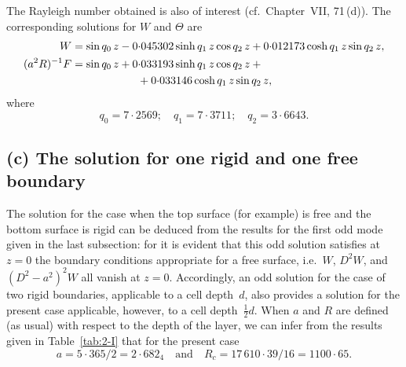 


The Rayleigh number obtained is also of interest (cf.\ Chapter~VII, 71\,(d)).
The corresponding solutions for $W$ and $\Theta$ are
\begin{align}
\label{eq:2-225}
W &= \sin q_0\,z - 0{\cdot}045302\sinh q_1\,z\cos q_2\,z + 0{\cdot}012173\cosh q_1\,z\sin q_2\,z, \notag\\
(a^2 R)^{-1}F &= \sin q_0\,z + 0{\cdot}033193\sinh q_1\,z\cos q_2\,z + {} \notag\\
&\qquad\qquad\qquad{} + 0{\cdot}033146\cosh q_1\,z\sin q_2\,z,
\end{align}
where
\begin{equation}
\label{eq:2-225p}
q_0 = 7{\cdot}2569;\quad q_1 = 7{\cdot}3711;\quad q_2 = 3{\cdot}6643.
\end{equation}


\subsection*{(c) The solution for one rigid and one free boundary}

The solution for the case when the top surface (for example) is free
and the bottom surface is rigid can be deduced from the results for the
first odd mode given in the last subsection: for it is evident that this odd
solution satisfies at $z = 0$ the boundary conditions appropriate for a
free surface, i.e.\ $W$, $D^2W$, and $(D^2 - a^2)^2W$ all vanish at $z = 0$.
Accordingly, an odd solution for the case of two rigid boundaries, applicable
to a cell depth~$d$, also provides a solution for the present case applicable,
however, to a cell depth~$\tfrac{1}{2}d$. When $a$ and $R$ are defined (as usual) with
respect to the depth of the layer, we can infer from the results given in
Table~\ref{tab:2-I} that for the present case
\begin{equation}
\label{eq:2-226b}
a = 5{\cdot}365/2 = 2{\cdot}682_4 \quad\text{and}\quad R_c = 17\,610{\cdot}39/16 = 1100{\cdot}65.
\end{equation}

